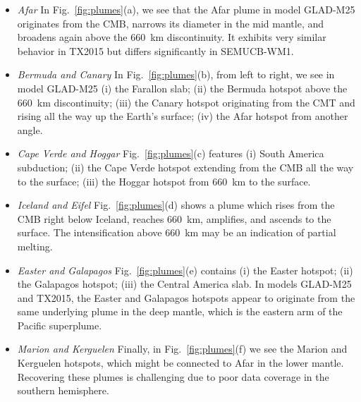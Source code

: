 \documentclass[extra,mreferee]{gji}
\begin{document}
\begin{itemize}
\item[]{\it Afar} In Fig.~\ref{fig:plumes}(a),
we see that the Afar plume in model GLAD-M25 originates from the CMB, narrows its diameter
in the mid mantle, and broadens again above the 660~km discontinuity.
It exhibits
very similar behavior in TX2015 but differs significantly in SEMUCB-WM1.  
\item[]{\it Bermuda and Canary} In Fig.~\ref{fig:plumes}(b), from left to right, we see in model GLAD-M25 (i) the Farallon
slab; (ii) the Bermuda hotspot above the 660~km discontinuity; (iii) the Canary hotspot originating from the CMT and
rising all the way up the Earth's surface; (iv) the Afar hotspot from another angle.
\item[]{\it Cape Verde and Hoggar} Fig.~\ref{fig:plumes}(c) features (i) South America subduction; (ii) the Cape Verde hotspot extending from the CMB all the way to the surface; (iii) the Hoggar hotspot from 660~km to the surface. 
\item[]{\it Iceland and Eifel} Fig.~\ref{fig:plumes}(d) shows a plume which rises from the CMB right below Iceland, reaches 660~km, amplifies,
and ascends to the surface.
The intensification above 660~km may be an indication of partial melting.
\item[]{\it Easter and Galapagos} Fig.~\ref{fig:plumes}(e) contains (i) the Easter hotspot; (ii) the Galapagos
hotspot; (iii) the Central America slab.
In models GLAD-M25 and TX2015,
the Easter and Galapagos hotspots appear to originate from the same underlying plume in the deep mantle,
which is the eastern arm of the Pacific superplume.
\item[]{\it Marion and Kerguelen}
Finally,
in Fig.~\ref{fig:plumes}(f) we see the Marion and Kerguelen hotspots, which might be connected to Afar in the lower mantle.
Recovering these plumes is challenging due to poor data coverage in the southern hemisphere.
\end{itemize}

\end{document}
